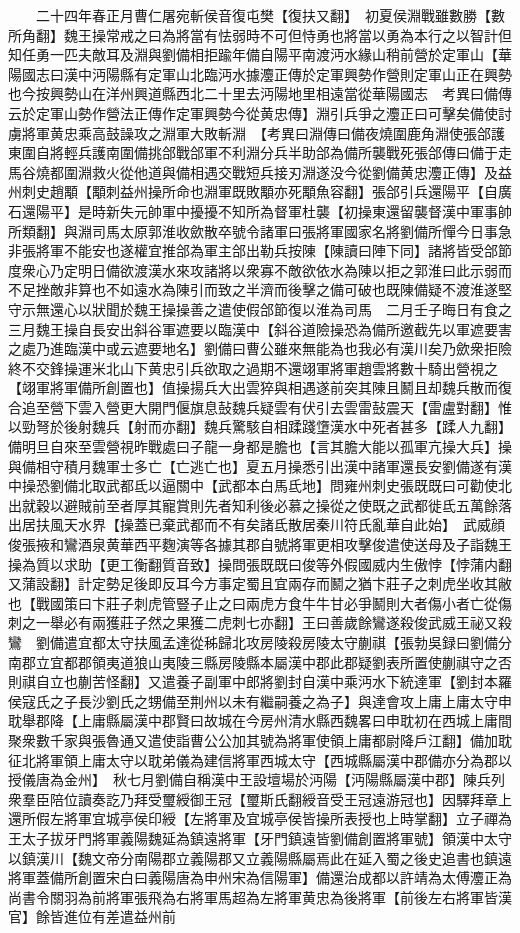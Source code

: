 　　二十四年春正月曹仁屠宛斬侯音復屯樊【復扶又翻】　初夏侯淵戰雖數勝【數所角翻】魏王操常戒之曰為將當有怯弱時不可但恃勇也將當以勇為本行之以智計但知任勇一匹夫敵耳及淵與劉備相拒踰年備自陽平南渡沔水緣山稍前營於定軍山【華陽國志曰漢中沔陽縣有定軍山北臨沔水據灋正傳於定軍興勢作營則定軍山正在興勢也今按興勢山在洋州興道縣西北二十里去沔陽地里相遠當從華陽國志　考異曰備傳云於定軍山勢作營法正傳作定軍興勢今從黄忠傳】淵引兵爭之灋正曰可擊矣備使討虜將軍黄忠乘高鼓譟攻之淵軍大敗斬淵　【考異曰淵傳曰備夜燒圍鹿角淵使張郃護東圍自將輕兵護南圍備挑郃戰郃軍不利淵分兵半助郃為備所襲戰死張郃傳曰備于走馬谷燒都圍淵救火從他道與備相遇交戰短兵接刃淵遂没今從劉備黄忠灋正傳】及益州刺史趙顒【顒刺益州操所命也淵軍既敗顒亦死顒魚容翻】張郃引兵還陽平【自廣石還陽平】是時新失元帥軍中擾擾不知所為督軍杜襲【初操東還留襲督漢中軍事帥所類翻】與淵司馬太原郭淮收歛散卒號令諸軍曰張將軍國家名將劉備所憚今日事急非張將軍不能安也遂權宜推郃為軍主郃出勒兵按陳【陳讀曰陣下同】諸將皆受郃節度衆心乃定明日備欲渡漢水來攻諸將以衆寡不敵欲依水為陳以拒之郭淮曰此示弱而不足挫敵非算也不如遠水為陳引而致之半濟而後擊之備可破也既陳備疑不渡淮遂堅守示無還心以狀聞於魏王操操善之遣使假郃節復以淮為司馬　二月壬子晦日有食之　三月魏王操自長安出斜谷軍遮要以臨漢中【斜谷道險操恐為備所邀截先以軍遮要害之處乃進臨漢中或云遮要地名】劉備曰曹公雖來無能為也我必有漢川矣乃歛衆拒險終不交鋒操運米北山下黄忠引兵欲取之過期不還翊軍將軍趙雲將數十騎出營視之【翊軍將軍備所創置也】值操揚兵大出雲猝與相遇遂前突其陳且鬭且却魏兵散而復合追至營下雲入營更大開門偃旗息鼔魏兵疑雲有伏引去雲雷鼔震天【雷盧對翻】惟以勁弩於後射魏兵【射而亦翻】魏兵驚駭自相蹂踐墯漢水中死者甚多【蹂人九翻】備明旦自來至雲營視昨戰處曰子龍一身都是膽也【言其膽大能以孤軍亢操大兵】操與備相守積月魏軍士多亡【亡逃亡也】夏五月操悉引出漢中諸軍還長安劉備遂有漢中操恐劉備北取武都氐以逼關中【武都本白馬氐地】問雍州刺史張既既曰可勸使北出就穀以避賊前至者厚其寵賞則先者知利後必慕之操從之使既之武都徙氐五萬餘落出居扶風天水界【操蓋已棄武都而不有矣諸氐散居秦川符氏亂華自此始】　武威顔俊張掖和鸞酒泉黄華西平麴演等各據其郡自號將軍更相攻擊俊遣使送母及子詣魏王操為質以求助【更工衡翻質音致】操問張既既曰俊等外假國威内生傲悖【悖蒲内翻又蒲設翻】計定勢足後即反耳今方事定蜀且宜兩存而鬭之猶卞莊子之刺虎坐收其敝也【戰國策曰卞莊子刺虎管豎子止之曰兩虎方食牛牛甘必爭鬭則大者傷小者亡從傷刺之一舉必有兩獲莊子然之果獲二虎刺七亦翻】王曰善歲餘鸞遂殺俊武威王祕又殺鸞　劉備遣宜都太守扶風孟達從秭歸北攻房陵殺房陵太守蒯祺【張勃吳録曰劉備分南郡立宜都郡領夷道狼山夷陵三縣房陵縣本屬漢中郡此郡疑劉表所置使蒯祺守之否則祺自立也蒯苦怪翻】又遣養子副軍中郎將劉封自漢中乘沔水下統達軍【劉封本羅侯寇氏之子長沙劉氏之甥備至荆州以未有繼嗣養之為子】與達會攻上庸上庸太守申耽舉郡降【上庸縣屬漢中郡賢曰故城在今房州清水縣西魏畧曰申耽初在西城上庸間聚衆數千家與張魯通又遣使詣曹公公加其號為將軍使領上庸都尉降戶江翻】備加耽征北將軍領上庸太守以耽弟儀為建信將軍西城太守【西城縣屬漢中郡備亦分為郡以授儀唐為金州】　秋七月劉備自稱漢中王設壇場於沔陽【沔陽縣屬漢中郡】陳兵列衆羣臣陪位讀奏訖乃拜受璽綬御王冠【璽斯氏翻綬音受王冠遠游冠也】因驛拜章上還所假左將軍宜城亭侯印綬【左將軍及宜城亭侯皆操所表授也上時掌翻】立子禪為王太子拔牙門將軍義陽魏延為鎮遠將軍【牙門鎮遠皆劉備創置將軍號】領漢中太守以鎮漢川【魏文帝分南陽郡立義陽郡又立義陽縣屬焉此在延入蜀之後史追書也鎮遠將軍蓋備所創置宋白曰義陽唐為申州宋為信陽軍】備還治成都以許靖為太傅灋正為尚書令關羽為前將軍張飛為右將軍馬超為左將軍黄忠為後將軍【前後左右將軍皆漢官】餘皆進位有差遣益州前